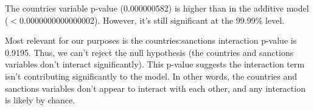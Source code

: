 \documentclass[12pt,letterpaper]{article}
\begin{document}
\begin{enumerate}
		\vspace{.35cm}
	
	The countries variable p-value (0.000000582) is higher than in the additive model ($<$0.0000000000000002). However, it's still significant at the 99.99$\%$ level. 
	
		\vspace{.35cm}
	
	Most relevant for our purposes is the countries:sanctions interaction p-value is 0.9195. Thus, we can't reject the null hypothesis (the countries and sanctions variables don't interact significantly). This p-value suggests the interaction term isn't contributing significantly to the model. In other words, the countries and sanctions variables don't appear to interact with each other, and any interaction is likely by chance.
\end{enumerate}
\end{document}
